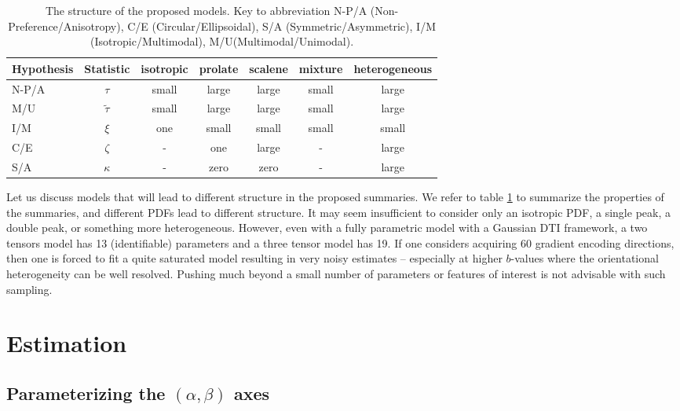 \documentclass[dvips,aoas,preprint]{imsart}
\numberwithin{equation}{section}
\theoremstyle{plain}
\begin{document}
{\tiny\begin{table}[!htbp]
  \caption{The structure of the proposed models. Key to abbreviation N-P/A (Non-Preference/Anisotropy), C/E (Circular/Ellipsoidal), S/A (Symmetric/Asymmetric), I/M (Isotropic/Multimodal), M/U(Multimodal/Unimodal).}
  \label{summaryofprop}
    \begin{tabular}{lcccccc}
      \hline
      Hypothesis & Statistic & isotropic & prolate & scalene & mixture & heterogeneous\\ 
      \hline
      N-P/A & $\tau$ & small & large & large & small & large \\ 
      M/U & $\tilde{\tau}$ & small & large & large & small & large \\ 
      I/M & $\xi$ & one  & small & small & small & small\\
      C/E & $\zeta$& - & one & large & - & large\\
      S/A & $\kappa$& - & zero & zero & - & large\\
      \hline
    \end{tabular}
\end{table}}

Let us discuss models that will lead to different structure in the
proposed summaries. We refer to table \ref{summaryofprop} to summarize
the properties of the summaries, and different PDFs lead to different
structure.  It may seem insufficient to consider only an isotropic
PDF, a single peak, a double peak, or something more heterogeneous.
However, even with a fully parametric model with a Gaussian DTI
framework, a two tensors model has 13 (identifiable) parameters and a
three tensor model has 19.  If one considers acquiring 60 gradient
encoding directions, then one is forced to fit a quite saturated model resulting in very noisy estimates -- especially at higher $b$-values where the
orientational heterogeneity can be well resolved.  Pushing much beyond
a small number of parameters or features of interest is not advisable
with such sampling.

\section{Estimation}
\label{matmeth}

\subsection{Parameterizing the $(\alpha,\beta)$ axes}
\end{document}
